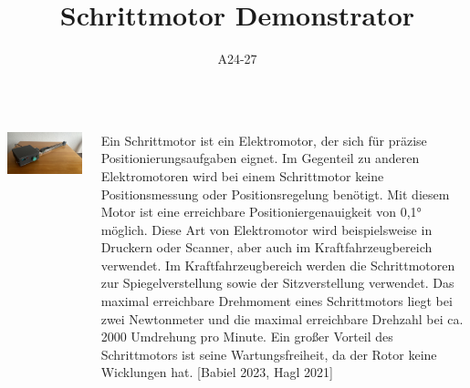 \documentclass[25pt,a0paper, portrait]{tikzposter}
\title{Schrittmotor Demonstrator}
\author{A24-27}
\begin{document}
 
\maketitle

\begin{columns} 
	
	{
		{
			\begin{tikzfigure}
				\includegraphics[width=\linewidth]{images/DemonstratorDrauf}
			\end{tikzfigure}	
		}
		{
			Ein Schrittmotor ist ein Elektromotor, der sich für präzise Positionierungsaufgaben eignet. Im Gegenteil zu anderen Elektromotoren wird bei einem Schrittmotor keine Positionsmessung oder Positionsregelung benötigt. Mit	diesem Motor ist eine erreichbare Positioniergenauigkeit von 0,1° möglich. Diese Art von Elektromotor wird beispielsweise in Druckern oder Scanner, aber auch im Kraftfahrzeugbereich verwendet. Im Kraftfahrzeugbereich werden die Schrittmotoren zur Spiegelverstellung sowie der Sitzverstellung verwendet. Das maximal erreichbare Drehmoment eines Schrittmotors liegt bei zwei Newtonmeter und die maximal erreichbare Drehzahl bei ca. 2000 Umdrehung pro Minute. Ein großer Vorteil des Schrittmotors ist seine Wartungsfreiheit, da der Rotor keine Wicklungen hat. [Babiel 2023, Hagl 2021]
		}
	}



\end{columns}
\end{document}
